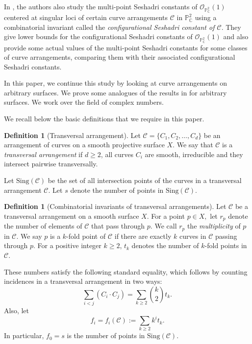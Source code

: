 \documentclass[12pt,reqno]{amsart}
\theoremstyle{plain}
\numberwithin{equation}{section}
\theoremstyle{definition}
\newtheorem{definition}[theorem]{Definition}
\begin{document}
	In \cite{JP}, the authors also study the multi-point Seshadri constants of $\mathcal{O}_{\mathbb{P}^{2}_{\mathbb{C}}}(1)$ centered at singular loci of certain curve arrangements $\mathcal{C}$ in ${\mathbb{P}^{2}_{\mathbb{C}}}$ using a combinatorial invariant called the  \textit{configurational Seshadri constant of $\mathcal{C}$}. They give lower bounds for the configurational Seshadri constants of $\mathcal{O}_{\mathbb{P}^{2}_{\mathbb{C}}}(1)$ and also provide some actual values of the multi-point Seshadri constants for some classes of curve arrangements, comparing them with their associated configurational Seshadri constants.
	
In this paper, we continue this study by looking at curve arrangements on arbitrary surfaces. We prove some analogues of the results in \cite{JP} for arbitrary surfaces. We work over the field of complex numbers. 


We recall below the basic definitions that we require in this paper. 	
	

	\begin{definition}[Transversal arrangement]
		Let $\mathcal{C}=\{C_1,C_2, \ldots ,C_d\}$ be an arrangement of curves
		on a smooth projective surface $X$.
		We say that $\mathcal{C}$ is a \emph{transversal arrangement}
		if $d\geq 2$, all  curves $C_i$ are smooth, irreducible 
		and they intersect pairwise transversally.
	\end{definition}
	
	Let $\text{Sing}(\mathcal{C})$ be the set of all intersection points
	of the curves in a transversal arrangement $\mathcal{C}$. 
	Let $s$ denote the number of points in $\text{Sing}(\mathcal{C})$. 
	
	
	\begin{definition}[Combinatorial invariants of transversal arrangements]
		Let	$\mathcal{C}$ be a transversal arrangement on a smooth surface
		$X$. For a point $p\in X,$
		let $r_p$ denote the  number of elements of $\mathcal{C}$ that pass
		through $p$. We call $r_p$ the \textit{multiplicity} of $p$ in
		$\mathcal{C}.$ We say $p$ is a $k$-fold point of $\mathcal{C}$ 
		if there are exactly $k$ curves in $\mathcal{C}$ passing through $p.$
		For a positive integer $k\geq2$, $t_k$ denotes the number of $k$-fold points in $\mathcal{C}$.
	\end{definition}
	These numbers satisfy the following standard equality, which follows by
	counting incidences in a transversal arrangement in two ways:
	\begin{equation}\label{eq:combinatorial general}
		\sum_{i<j}(C_i\cdot C_j)=\sum_{k\geq 2}\binom{k}{2}t_k.
	\end{equation}
	Also, let $$f_i=f_i(\mathcal C) :=\sum_{k\geq 2}k^i t_k.$$
	In particular, $f_0=s$ is the number of points in
	$\text{Sing}(\mathcal{C})$. 
	
\end{document}
